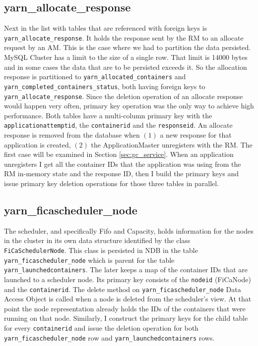 \subsection{yarn\_allocate\_response}
\label{ssec:impl_fk_alloc_resp}
Next in the list with tables that are referenced with foreign keys is
\texttt{yarn\_allocate\_response}. It holds the response sent by the
RM to an allocate request by an AM. This is the case where we had to
partition the data persisted. MySQL Cluster has a limit to the size of
a single row. That limit is 14000 bytes \cite{ndb_row_limit} and in
some cases the data that are to be persisted exceeds it. So the
allocation response is partitioned to
\texttt{yarn\_allocated\_containers} and
\texttt{yarn\_completed\_containers\_status}, both having foreign keys
to \texttt{yarn\_allocate\_response}. Since the deletion operation of
an allocate response would happen very often, primary key operation
was the only way to achieve high performance. Both tables have a
multi-column primary key with the \texttt{applicationattemptid}, the
\texttt{containerid} and the \texttt{responseid}. An allocate response
is removed from the database when $(1)$ a new response for that
application is created, $(2)$ the ApplicationMaster unregisters with
the RM. The first case will be examined in Section
\ref{sec:gc_service}. When an application unregisters I get all the
container IDs that the application was using from the RM in-memory
state and the response ID,
then I build the primary keys and issue primary key deletion
operations for those three tables in parallel.

\subsection{yarn\_ficascheduler\_node}
\label{ssec:impl_fk_fica_node}
The scheduler, and specifically Fifo and Capacity, holds information for the nodes in the cluster in its
own data structure identified by the class \texttt{FiCaSchedulerNode}. This
class is persisted in NDB in the table
\texttt{yarn\_ficascheduler\_node} which is parent for the table
\texttt{yarn\_launchedcontainers}. The later keeps a map of the
container IDs that are launched to a scheduler node. Its primary key
consists of the \texttt{nodeid} (FiCaNode) and the
\texttt{containerid}. The delete method on
\texttt{yarn\_ficascheduler\_node} Data Access Object is called when a
node is deleted from the scheduler's view. At that point the node
representation already holds the IDs of the containers that were
running on that node. Similarly, I construct the primary keys for the
child table for every \texttt{containerid} and issue the deletion operation for both
\texttt{yarn\_ficascheduler\_node} row and
\texttt{yarn\_launchedcontainers} rows.

